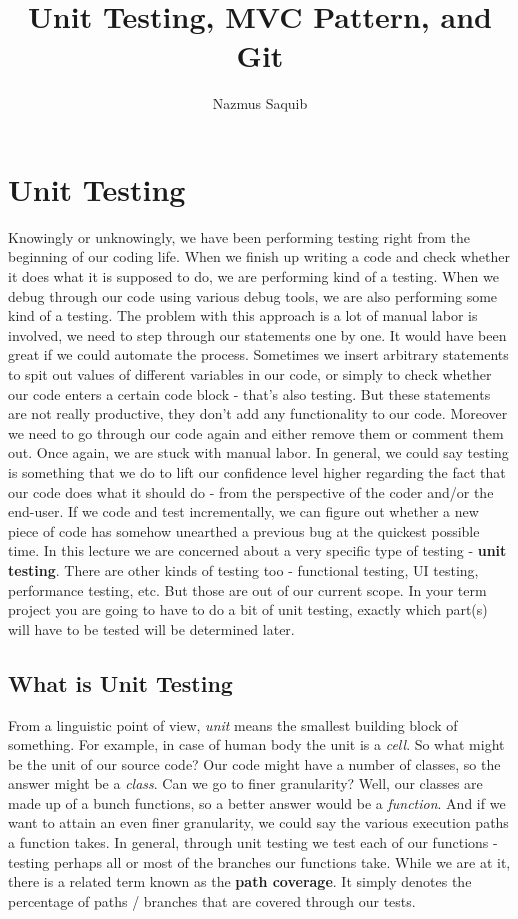 \documentclass{article}
\begin{document}
\title{Unit Testing, MVC Pattern, and Git}
\author{Nazmus Saquib}

\maketitle
\newpage

\tableofcontents
\newpage

\section{Unit Testing}
Knowingly or unknowingly, we have been performing testing right from the beginning of our coding life.
When we finish up writing a code and check whether it does what it is supposed to do,
we are performing kind of a testing.
When we debug through our code using various debug tools, we are also performing some kind of a testing.
The problem with this approach is a lot of manual labor is involved, we need to step through our statements one by one.
It would have been great if we could automate the process.
Sometimes we insert arbitrary statements to spit out values of different variables in our code,
or simply  to check whether our code enters a certain code block - that's also testing.
But these statements are not really productive, they don't add any functionality to our code.
Moreover we need to go through our code again and either remove them or comment them out.
Once again, we are stuck with manual labor.
In general, we could say testing is something that we do to lift our confidence level higher regarding the fact that
our code does what it should do - from the perspective of the coder and/or the end-user.
If we code and test incrementally, we can figure out whether a new piece of code has somehow unearthed a previous bug
at the quickest possible time.
In this lecture we are concerned about a very specific type of testing - \textbf{unit testing}.
There are other kinds of testing too - functional testing, UI testing, performance testing, etc.
But those are out of our current scope.
In your term project you are going to have to do a bit of unit testing, exactly which part(s) will have to be tested
will be determined later.

\subsection{What is Unit Testing}
From a linguistic point of view, \textit{unit} means the smallest building block of something.
For example, in case of human body the unit is a \textit{cell}.
So what might be the unit of our source code? Our code might have a number of classes, so the answer might be a \textit{class}.
Can we go to finer granularity? Well, our classes are made up of a bunch functions, so a better answer would be a \textit{function}.
And if we want to attain an even finer granularity, we could say the various execution paths a function takes.
In general, through unit testing we test each of our functions - 
testing perhaps all or most of the branches our functions take.
While we are at it, there is a related term known as the \textbf{path coverage}.
It simply denotes the percentage of paths / branches that are covered through our tests.
\end{document}
